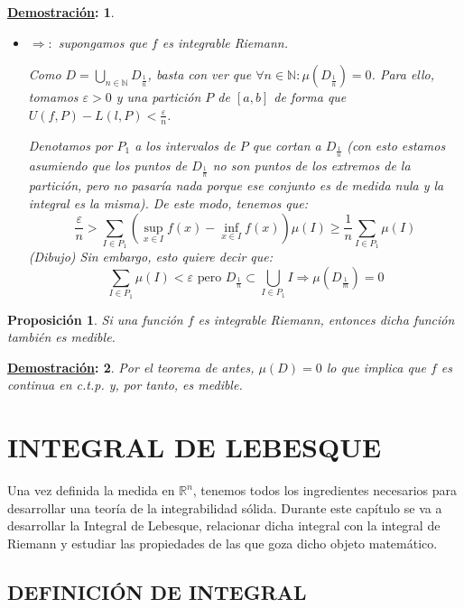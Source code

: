\documentclass[10pt,a4paper,openright]{book}
\theoremstyle{break}
\newtheorem*{prop}{Proposición}
\newtheorem*{demo}{\underline{Demostración}:}
\begin{document}
\begin{demo}
\begin{itemize}
\item $\Rightarrow:$ supongamos que $f$ es integrable Riemann.

Como $D = \bigcup_{n \in \mathbb{N}} D_{\frac{1}{n}}$, basta con ver que $\forall n \in \mathbb{N}: \mu\left(D_{\frac{1}{n}}\right) = 0$. Para ello, tomamos $\varepsilon > 0$ y una partición $P$ de $\left[a, b\right]$ de forma que $U\left(f, P\right) - L\left(l, P\right) < \frac{\varepsilon}{n}$.

Denotamos por $P_1$ a los intervalos de $P$ que cortan a $D_{\frac{1}{n}}$ (con esto estamos asumiendo que los puntos de $D_{\frac{1}{n}}$ no son puntos de los extremos de la partición, pero no pasaría nada porque ese conjunto es de medida nula y la integral es la misma). De este modo, tenemos que:
$$\frac{\varepsilon}{n} > \sum_{I \in P_1} \left(\sup_{x \in I} f\left(x\right) - \inf_{x \in I} f\left(x\right) \right) \mu\left(I\right) \ge \frac{1}{n} \sum_{I \in P_1} \mu\left(I\right)$$
(\textit{Dibujo})
Sin embargo, esto quiere decir que:
$$\sum_{I \in P_1} \mu\left(I\right) < \varepsilon \mbox{ pero } D_{\frac{1}{n}} \subset \bigcup_{I \in P_1} I \Rightarrow \mu\left(D_{\frac{1}{m}}\right) = 0$$
\end{itemize}
\end{demo}

\begin{prop}
Si una función $f$ es integrable Riemann, entonces dicha función también es medible.
\end{prop}
\begin{demo}
Por el teorema de antes, $\mu(D) = 0$ lo que implica que $f$ es continua en c.t.p. y, por tanto, es medible.
\end{demo}

\chapter*{INTEGRAL DE LEBESQUE}
Una vez definida la medida en $\mathbb{R}^n$, tenemos todos los ingredientes necesarios para desarrollar una teoría de la integrabilidad sólida. Durante este capítulo se va a desarrollar la Integral de Lebesque, relacionar dicha integral con la integral de Riemann y estudiar las propiedades de las que goza dicho objeto matemático.

\section*{DEFINICIÓN DE INTEGRAL}
\end{document}
